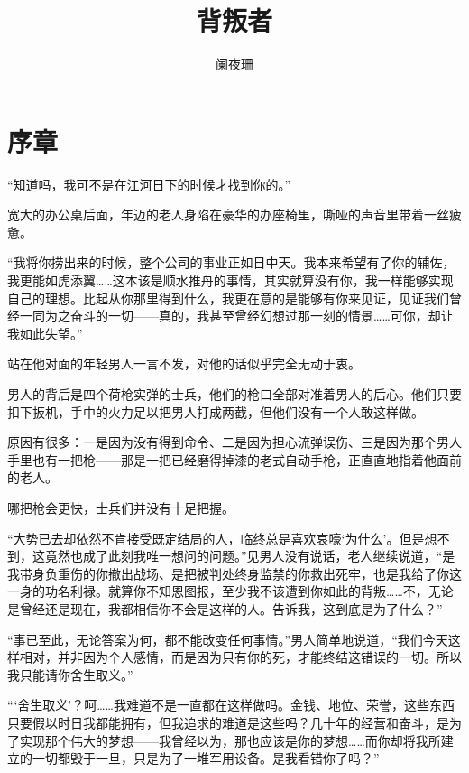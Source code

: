 \documentclass[openany,a4paper]{ctexbook}
\title{背叛者}
\author{阑夜珊}
\newcommand\specialsectioning{\setcounter{secnumdepth}{-2}}
\begin{document}
\maketitle
\tableofcontents

\mainmatter


\specialsectioning{}
\part{序章}

\setcounter{secnumdepth}{0}
“知道吗，我可不是在江河日下的时候才找到你的。”

宽大的办公桌后面，年迈的老人身陷在豪华的办座椅里，嘶哑的声音里带着一丝疲惫。

“我将你捞出来的时候，整个公司的事业正如日中天。我本来希望有了你的辅佐，我更能如虎添翼……这本该是顺水推舟的事情，其实就算没有你，我一样能够实现自己的理想。比起从你那里得到什么，我更在意的是能够有你来见证，见证我们曾经一同为之奋斗的一切——真的，我甚至曾经幻想过那一刻的情景……可你，却让我如此失望。”

站在他对面的年轻男人一言不发，对他的话似乎完全无动于衷。

男人的背后是四个荷枪实弹的士兵，他们的枪口全部对准着男人的后心。他们只要扣下扳机，手中的火力足以把男人打成两截，但他们没有一个人敢这样做。

原因有很多：一是因为没有得到命令、二是因为担心流弹误伤、三是因为那个男人手里也有一把枪——那是一把已经磨得掉漆的老式自动手枪，正直直地指着他面前的老人。

哪把枪会更快，士兵们并没有十足把握。

“大势已去却依然不肯接受既定结局的人，临终总是喜欢哀嚎‘为什么’。但是想不到，这竟然也成了此刻我唯一想问的问题。”见男人没有说话，老人继续说道，“是我带身负重伤的你撤出战场、是把被判处终身监禁的你救出死牢，也是我给了你这一身的功名利禄。就算你不知恩图报，至少我不该遭到你如此的背叛……不，无论是曾经还是现在，我都相信你不会是这样的人。告诉我，这到底是为了什么？”

“事已至此，无论答案为何，都不能改变任何事情。”男人简单地说道，“我们今天这样相对，并非因为个人感情，而是因为只有你的死，才能终结这错误的一切。所以我只能请你舍生取义。”

“‘舍生取义’？呵……我难道不是一直都在这样做吗。金钱、地位、荣誉，这些东西只要假以时日我都能拥有，但我追求的难道是这些吗？几十年的经营和奋斗，是为了实现那个伟大的梦想——我曾经以为，那也应该是你的梦想……而你却将我所建立的一切都毁于一旦，只是为了一堆军用设备。是我看错你了吗？”
\end{document}
